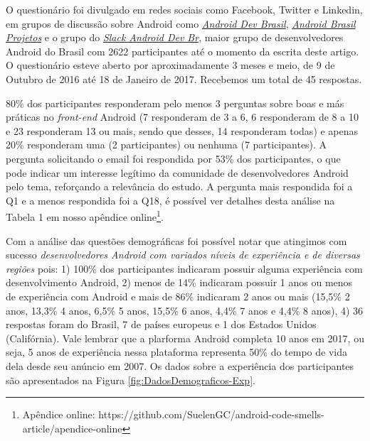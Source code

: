 
O questionário foi divulgado em redes sociais como Facebook, Twitter e Linkedin, em grupos de discussão sobre Android como \href{https://groups.google.com/forum/#!forum/androidbrasil-dev}{\textit{Android Dev Brasil}}, \href{https://groups.google.com/forum/\#!forum/android-brasil--projetos}{\textit{Android Brasil Projetos}} e o grupo do \href{http://slack.androiddevbr.org/}{\textit{Slack Android Dev Br}}, maior grupo de desenvolvedores Android do Brasil com 2622 participantes até o momento da escrita deste artigo. 
O questionário esteve aberto por aproximadamente 3 meses e meio, de 9 de Outubro de 2016 até 18 de Janeiro de 2017. Recebemos um total de 45 respostas. 

80\% dos participantes responderam pelo menos 3 perguntas sobre boas e más práticas no \textit{front-end} Android (7 responderam de 3 a 6, 6 responderam de 8 a 10 e 23 responderam 13 ou mais, sendo que desses, 14 responderam todas) e apenas 20\% responderam uma (2 participantes) ou nenhuma (7 participantes). A pergunta solicitando o email foi respondida por 53\% dos participantes, o que pode indicar um interesse legítimo da comunidade de desenvolvedores Android pelo tema, reforçando a relevância do estudo. A pergunta mais respondida foi a Q1 e a menos respondida foi a Q18, é possível ver detalhes desta análise na Tabela 1 em nosso apêndice online\footnote{Apêndice online: https://github.com/SuelenGC/android-code-smells-article/apendice-online}.



Com a análise das questões demográficas foi possível notar que atingimos com sucesso \textit{desenvolvedores Android com variados níveis de experiência e de diversas regiões} pois: 1) 100\% dos participantes indicaram possuir alguma experiência com desenvolvimento Android, 2) menos de 14\% indicaram possuir 1 anos ou menos de experiência com Android e mais de 86\% indicaram 2 anos ou mais (15,5\% 2 anos, 13,3\% 4 anos, 6,5\% 5 anos, 15,5\% 6 anos, 4,4\% 7 anos e 4,4\% 8 anos), 4) 36 respostas foram do Brasil, 7 de países europeus e 1 dos Estados Unidos (Califórnia). Vale lembrar que a plarforma Android completa 10 anos em 2017, ou seja, 5 anos de experiência nessa plataforma representa 50\% do tempo de vida dela desde seu anúncio em 2007. Os dados sobre a experiência dos participantes são apresentados na Figura \ref{fig:DadosDemograficos-Exp}.

